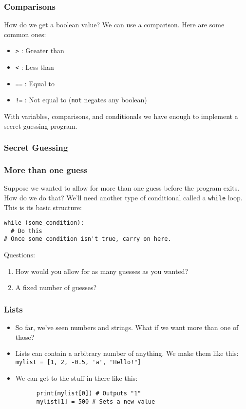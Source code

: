 \documentclass{beamer}
\begin{document}
\begin{frame}[fragile]
  \frametitle{Comparisons}

  How do we get a boolean value? We can use a comparison. Here are some common ones:\\

  \begin{itemize}
    \item \lstinline!>! : Greater than
    \item \lstinline!<! : Less than
    \item \lstinline!==! : Equal to
    \item \lstinline^!=^ : Not equal to (\lstinline^not^ negates any boolean) 
  \end{itemize}

  With variables, comparisons, and conditionals we have enough to implement a secret-guessing program.

\end{frame}

\begin{frame}[fragile]
  \frametitle{Secret Guessing}

  
  
\end{frame}

\begin{frame}[fragile]
  \frametitle{More than one guess}
  Suppose we wanted to allow for more than one guess before the program exits. How do we do that?
  We'll need another type of conditional called a \lstinline{while} loop. This is its basic structure:

  \begin{lstlisting}
while (some_condition):
  # Do this
# Once some_condition isn't true, carry on here.
  \end{lstlisting}

  Questions:
  \begin{enumerate}
    \item How would you allow for as many guesses as you wanted?
    \item A fixed number of guesses?
  \end{enumerate}
\end{frame}


\begin{frame}[fragile]
  \frametitle {Lists}
  \begin{itemize}
    \item So far, we've seen numbers and strings. What if we want more than one of those?
    \item Lists can contain a arbitrary number of anything. We make them like this:
    \lstinline{ mylist = [1, 2, -0.5, 'a', "Hello!"]}
    \item We can get to the stuff in there like this: \\
    \begin{lstlisting}
      print(mylist[0]) # Outputs "1"
      mylist[1] = 500 # Sets a new value
    \end{lstlisting}
  \end{itemize}
\end{frame}
\end{document}
